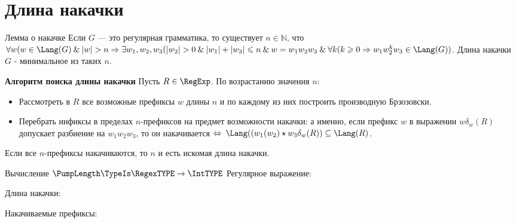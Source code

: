 \section{Длина накачки}
\begin{frame}{Лемма о накачке}
    \vspace{-5pt}
    Если $G$ — это регулярная грамматика, то существует $n \in \mathbb{N}$, что $\forall w(w \in \Lang(G) \:  \& \: |w| > n \Rightarrow \exists w_1, w_2, w_3(|w_2| > 0 \: \&  \: |w_1| + |w_3| \leqslant n \: \& \: w = w_1w_2w_3 \: \& \: \forall k(k\geqslant0 \Rightarrow w_1w_2^kw_3 \in \Lang(G))$. Длина накачки $G$ - минимальное из таких $n$.
    \begin{block}{\bf Алгоритм поиска длины накачки}
    Пусть $R\in\RegExp$. По возрастанию значения $n$:
    \begin{itemize}
        \item Рассмотреть в $R$ все возможные префиксы $w$ длины $n$ и по каждому из них построить производную Брзозовски.
        \item Перебрать инфиксы в пределах $n$-префиксов на предмет возможности накачки: а именно, если префикс $w$ в выражении $w\delta_w(R)$ допускает разбиение на $w_1w_2w_3$, то он накачивается $\Leftrightarrow \: \Lang((w_1(w_2) \star w_3\delta_w(R)) \subseteq \Lang(R)$.
    \end{itemize}
    Если все $n$-префиксы накачиваются, то $n$ и есть искомая длина накачки.
    \end{block}
\end{frame} %
\begin{frame}{Вычисление $\PumpLength\TypeIs\RegexTYPE\to\IntTYPE$}
    \vspace{-5pt}
    Регулярное выражение:

	Длина накачки:

    Накачиваемые префиксы:
    

\end{frame}

